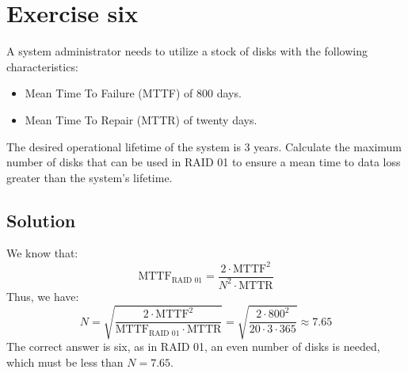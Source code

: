 \section{Exercise six}

A system administrator needs to utilize a stock of disks with the following characteristics:
\begin{itemize}
    \item Mean Time To Failure (MTTF) of 800 days.
    \item Mean Time To Repair (MTTR) of twenty days.
\end{itemize}
The desired operational lifetime of the system is 3 years.
Calculate the maximum number of disks that can be used in RAID 01 to ensure a mean time to data loss greater than the system's lifetime.

\subsection*{Solution}
We know that:
\[\text{MTTF}_{\text{RAID 01}}=\dfrac{2\cdot \text{MTTF}^2}{N^2\cdot\text{MTTR}}\]
Thus, we have:
\[N=\sqrt{\dfrac{2\cdot\text{MTTF}^2}{\text{MTTF}_{\text{RAID 01}}\cdot\text{MTTR}}}=\sqrt{\dfrac{2\cdot800^2}{20\cdot 3\cdot 365}}\approx 7.65\]
The correct answer is six, as in RAID 01, an even number of disks is needed, which must be less than $N=7.65$.
